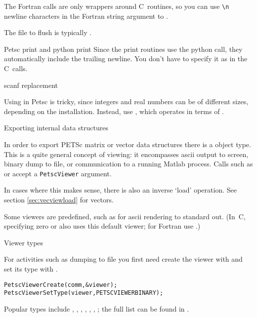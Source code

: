 \begin{fortrannote}
  The Fortran calls are only wrappers around C~routines, so you can 
  use \verb+\n+ newline characters in the Fortran string argument
  to .

  The file to flush is typically .
\end{fortrannote}

\begin{pythonnote}{Petsc print and python print}
  Since the print routines use the python  call, they
  automatically include the trailing newline. You don't have to
  specify it as in the C~calls.
\end{pythonnote}

 {scanf replacement}

Using  in Petsc is tricky, since integers and real numbers can be
of different sizes, depending on the installation.
Instead, use , which operates in terms of
.

 {Exporting internal data structures}
\label{sec:petsc-view}

In order to export PETSc matrix or vector data structures
there is a  object type.
This is a quite general concept of viewing: it encompasses ascii output to screen,
binary dump to file, or communication to a running Matlab process.
Calls such as   or 
accept a \lstinline{PetscViewer} argument.

In cases where this makes sense, there is also an inverse `load' operation.
See section \ref{sec:vecviewload} for vectors.

Some viewers are predefined, such as
 for ascii rendering to
standard out. (In~C, specifying zero or  also uses this
default viewer; for Fortran use .)

 {Viewer types}

For activities such as dumping to file
you first need create the viewer
with 
and set its type with .
\begin{lstlisting}
PetscViewerCreate(comm,&viewer);
PetscViewerSetType(viewer,PETSCVIEWERBINARY);  
\end{lstlisting}
Popular types include
,
,
,
,
,
,
;
the full list can be found in .

